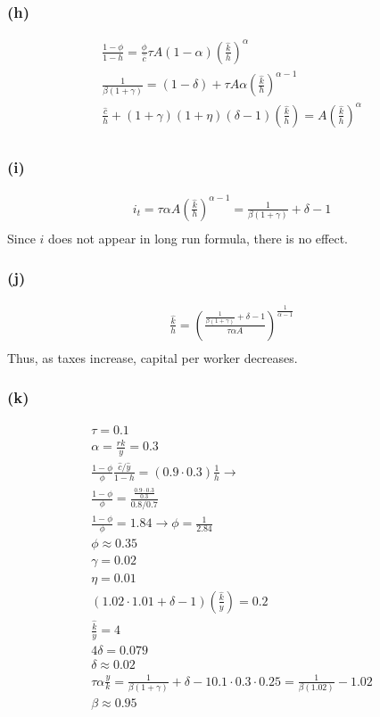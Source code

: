 \documentclass[10pt, a4paper]{article}
\begin{document}
    \subsubsection*{(h)}
      \begin{gather*}
        \frac{1-\phi}{1-h} = \frac{\phi}{\hat{c}}\tau A(1-\alpha)(\frac{\hat{k}}{h})^{\alpha} \\
        \frac{1}{\beta(1+\gamma)} = (1-\delta)+\tau A\alpha(\frac{\hat{k}}{h})^{\alpha-1} \\
        \frac{\hat{c}}{h} + (1+\gamma)(1+\eta)(\delta-1)(\frac{\hat{k}}{h}) = A(\frac{\hat{k}}{h})^{\alpha} \\
      \end{gather*}
    \subsubsection*{(i)}
      \begin{gather*}
        i_t = \tau\alpha A(\frac{\hat{k}}{h})^{\alpha-1} = \frac{1}{\beta(1+\gamma)}+\delta -1 \\
      \end{gather*}
      Since $i$ does not appear in long run formula, there is no effect.
    \subsubsection*{(j)}
      \begin{gather*}
        \frac{\hat{k}}{h} = (\frac{\frac{1}{\beta(1+\gamma)}+\delta-1}{\tau\alpha A})^{\frac{1}{\alpha-1}} \\
      \end{gather*}
      Thus, as taxes increase, capital per worker decreases.
    \subsubsection*{(k)}
      \begin{gather*}
        \tau = 0.1 \\
        \alpha = \frac{rk}{y} = 0.3 \\
        \frac{1-\phi}{\phi} \frac{\hat{c}/\hat{y}}{1-h} = (0.9\cdot0.3)\frac{1}{h} \rightarrow \\
        \frac{1-\phi}{\phi} = \frac{\frac{0.9\cdot0.3}{0.3}}{0.8/0.7} \\
        \frac{1-\phi}{\phi} = 1.84 \rightarrow \phi = \frac{1}{2.84} \\
        \phi \approx 0.35 \\
        \gamma = 0.02 \\
        \eta = 0.01 \\
        (1.02\cdot1.01+\delta-1)(\frac{\hat{k}}{y}) = 0.2 \\
        \frac{\hat{k}}{y} = 4 \\
        4\delta = 0.079 \\
        \delta \approx 0.02 \\
        \tau\alpha\frac{y}{k} = \frac{1}{\beta(1+\gamma)}+\delta-1
        0.1\cdot0.3\cdot0.25 = \frac{1}{\beta(1.02)}-1.02 \\
        \beta \approx 0.95
      \end{gather*}
\end{document}
